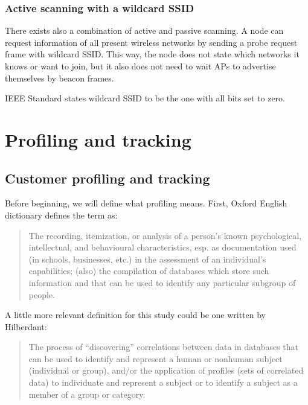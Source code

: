 \documentclass[12pt,a4paper,oneside,pdftex]{report}
\begin{document}
\subsection{Active scanning with a wildcard SSID}
\label{subsec:active_wildcard}

There exists also a combination of active and passive scanning. A node can request information of all present wireless networks by sending a probe request frame with wildcard SSID. This way, the node does not state which networks it knows or want to join, but it also does not need to wait APs to advertise themselves by beacon frames.

IEEE Standard states wildcard SSID to be the one with all bits set to zero. 




\chapter{Profiling and tracking}
\label{chapter:profiling}

\section{Customer profiling and tracking}
\label{sec:profiling}

Before beginning, we will define what profiling means. First, Oxford English dictionary defines the term as: \cite{oed_profiling}

\begin{quotation}
The recording, itemization, or analysis of a person's known psychological, intellectual, and behavioural characteristics, esp. as documentation used (in schools, businesses, etc.) in the assessment of an individual's capabilities; (also) the compilation of databases which store such information and that can be used to identify any particular subgroup of people.
\end{quotation}

A little more relevant definition for this study could be one written by Hilberdant: \cite{hildebrandt2008}

\begin{quotation}
The process of ``discovering'' correlations between data in databases that can be used to identify and represent a human or nonhuman subject (individual or group), and/or the application of profiles (sets of correlated data) to individuate and represent a subject or to identify a subject as a member of a group or category.
\end{quotation}
\end{document}
